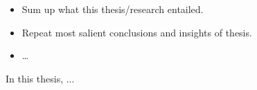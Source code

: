 \begin{itemize}
    \item Sum up what this thesis/research entailed.
    \item Repeat most salient conclusions and insights of thesis.
    \item \dots
\end{itemize}

In this thesis, ...